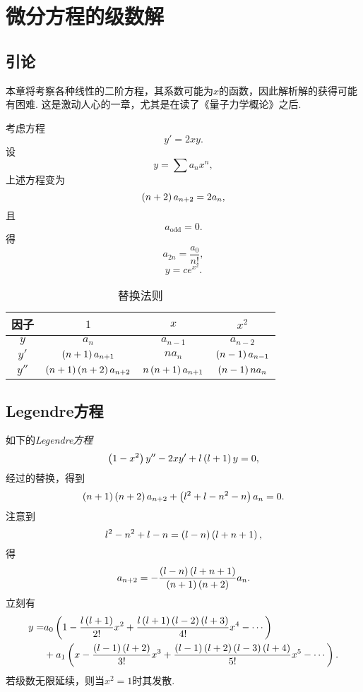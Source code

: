 \documentclass[UTF-8]{ctexart}
\begin{document}
  \section{微分方程的级数解}
  \subsection{引论}
  本章将考察各种线性的二阶方程，其系数可能为$x$的函数，因此解析解的获得可能有困难. 这是激动人心的一章，尤其是在读了《量子力学概论》之后.
  \begin{ex}
    考虑方程
    \[ y' = 2xy. \]
    设
    \[ y = \sum a_n x^n, \]
    上述方程变为
    \[ \left(n+2\right)a_{n+2} = 2a_n, \]
    且
    \[ a_\text{odd} = 0. \]
    得
    \[ a_{2n} = \frac{a_0}{n!}, \]
    \[ y = ce^{x^2}. \]
  \end{ex}
  \begin{table}[!ht]
  \centering
    \begin{tabular}{|c|c|c|c|}
    \hline
    因子 & $1$ & $x$ & $x^2$ \\
    \hline
    $y$ & $a_n$ & $a_{n-1}$ & $a_{n-2}$ \\
    \hline
    $y'$ & $\left(n+1\right)a_{n+1}$ & $na_n$ & $\left(n-1\right)a_{n-1}$ \\
    \hline
    $y''$ & $\left(n+1\right)\left(n+2\right)a_{n+2}$ & $n\left(n+1\right)a_{n+1}$ & $\left(n-1\right)na_n$ \\
    \hline
    \end{tabular}
    \caption{替换法则}
    \label{table:subst}
  \end{table}
  \subsection{Legendre方程}
  如下的\emph{Legendre方程}
  \[ \left(1-x^2\right)y'' - 2xy' + l\left(l+1\right)y = 0, \]
  经过的替换，得到
  \[ \left(n+1\right)\left(n+2\right)a_{n+2} + \left(l^2+l-n^2-n\right)a_n = 0. \]
  注意到
  \[ l^2-n^2+l-n = \left(l-n\right)\left(l+n+1\right), \]
  得
  \[ a_{n+2} = -\frac{\left(l-n\right)\left(l+n+1\right)}{\left(n+1\right)\left(n+2\right)}a_n. \]
  立刻有
  \begin{align*}
    y = & a_0\left(1-\frac{l\left(l+1\right)}{2!}x^2 + \frac{l\left(l+1\right)\left(l-2\right)\left(l+3\right)}{4!}x^4-\cdots\right)\\
    & + a_1\left(x-\frac{\left(l-1\right)\left(l+2\right)}{3!}x^3 + \frac{\left(l-1\right)\left(l+2\right)\left(l-3\right)\left(l+4\right)}{5!}x^5-\cdots\right).
  \end{align*}
  若级数无限延续，则当$x^2=1$时其发散.
\end{document}
